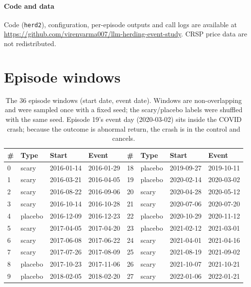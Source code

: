 \documentclass[10pt]{article}
\begin{document}
\paragraph{Code and data} Code (\texttt{herd2}), configuration, per-episode outputs and call logs are available at \url{https://github.com/virenvarma007/llm-herding-event-study}. CRSP price data are not redistributed.




\appendix
\section{Episode windows}
\label{app:episodes}
\begin{table}[H]
  \centering\small
  \caption{The 36 episode windows (start date, event date). Windows are non-overlapping and were sampled once with a fixed seed; the scary/placebo labels were shuffled with the same seed. Episode 19's event day (2020-03-02) sits inside the COVID crash; because the outcome is abnormal return, the crash is in the control and cancels.}
  \setlength{\tabcolsep}{3.5pt}\footnotesize
  \begin{tabular}{llll@{\quad}llll}
    \toprule
    \# & Type & Start & Event & \# & Type & Start & Event \\
    \midrule
    0 & scary & 2016-01-14 & 2016-01-29 & 18 & placebo & 2019-09-27 & 2019-10-11 \\
    1 & scary & 2016-03-21 & 2016-04-05 & 19 & placebo & 2020-02-14 & 2020-03-02 \\
    2 & scary & 2016-08-22 & 2016-09-06 & 20 & scary & 2020-04-28 & 2020-05-12 \\
    3 & scary & 2016-10-14 & 2016-10-28 & 21 & scary & 2020-07-06 & 2020-07-20 \\
    4 & placebo & 2016-12-09 & 2016-12-23 & 22 & placebo & 2020-10-29 & 2020-11-12 \\
    5 & scary & 2017-04-05 & 2017-04-20 & 23 & placebo & 2021-02-12 & 2021-03-01 \\
    6 & scary & 2017-06-08 & 2017-06-22 & 24 & scary & 2021-04-01 & 2021-04-16 \\
    7 & scary & 2017-07-26 & 2017-08-09 & 25 & scary & 2021-08-19 & 2021-09-02 \\
    8 & placebo & 2017-10-23 & 2017-11-06 & 26 & scary & 2021-10-07 & 2021-10-21 \\
    9 & placebo & 2018-02-05 & 2018-02-20 & 27 & scary & 2022-01-06 & 2022-01-21 \\

\end{tabular}
\end{table}
\end{document}
